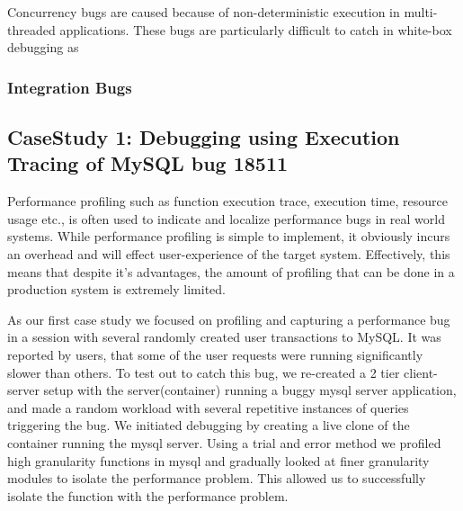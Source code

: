 Concurrency bugs are caused because of non-deterministic execution in multi-threaded applications.
These bugs are particularly difficult to catch in white-box debugging as 

\subsubsection{Integration Bugs}
\label{sec:integrationBugs}


\iffalse
\subsection{CaseStudy 1: Debugging using Execution Tracing of MySQL bug 18511}  
Performance profiling such as function execution trace, execution time, resource usage etc., is often used to indicate and localize performance bugs in real world systems. 
While performance profiling is simple to implement, it obviously incurs an overhead and will effect user-experience of the target system.
Effectively, this means that despite it's advantages, the amount of profiling that can be done in a production system is extremely limited. 

As our first case study we focused on profiling and capturing a performance bug in a session with several randomly created user transactions to MySQL. 
It was reported by users, that some of the user requests were running significantly slower than others.
To test out \parikshan to catch this bug, we re-created a 2 tier client-server setup with the server(container) running a buggy mysql server application, and made a random workload with several repetitive instances of queries triggering the bug.
We initiated debugging by creating a live clone of the container running the mysql server.
Using a trial and error method we profiled high granularity functions in mysql and gradually looked at finer granularity modules to isolate the performance problem.
This allowed us to successfully isolate the function with the performance problem.

